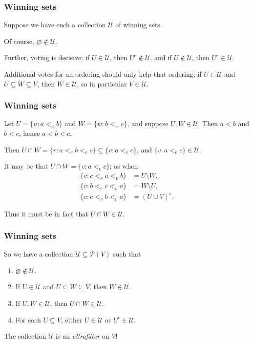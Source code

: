 \documentclass{beamer}
\theoremstyle{definition}
\begin{document}
\begin{frame}
    \frametitle{Winning sets}

    Suppose we have such a collection $\mathcal{U}$ of winning sets.

    \pause
    Of course, $\varnothing \notin \mathcal{U}$.

    \pause
    Further, voting is decisive: if $U \in \mathcal{U}$, then $U^c \notin \mathcal{U}$, and if $U \notin \mathcal{U}$, then $U^c \in \mathcal{U}$.

    \pause
    Additional votes for an ordering should only help that ordering; if $U \in \mathcal{U}$ and $U \subseteq W \subseteq V$, then $W \in \mathcal{U}$,
    so in particular $V \in \mathcal{U}$.

\end{frame}

\begin{frame}
    \frametitle{Winning sets}
    
    Let $U = \{u : a <_u b\}$ and $W = \{w : b <_w c\}$, and suppose $U, W \in \mathcal{U}$. Then $a < b$ and $b < c$, hence $a < b < c$.
    
    \pause
    Then $U \cap W = \{ v : a <_v b <_v c\} \subseteq \{v : a <_v c\}$, and $\{v : a <_v c\} \in \mathcal{U}$.

    \pause
    It may be that $U \cap W = \{v : a <_v c\}$; as when
    \begin{align*}
        \{v : c <_v a <_v b\} &= U \setminus W, \\
        \{v : b <_v c <_v a\} &= W \setminus U, \\
        \{v : c <_v b <_v a\} &= (U \cup V)^c.
    \end{align*}

    \pause
    Thus it must be in fact that $U \cap W \in \mathcal{U}$.

\end{frame}

\begin{frame}
    \frametitle{Winning sets}

    So we have a collection $\mathcal{U} \subseteq \mathcal{P}(V)$ such that
    \begin{enumerate}
        \item $\varnothing \notin \mathcal{U}$.
        \item If $U \in \mathcal{U}$ and $U \subseteq W \subseteq V$, then $W \in \mathcal{U}$.
        \item If $U, W \in \mathcal{U}$, then $U \cap W \in \mathcal{U}$.
        \item For each $U \subseteq V$, either $U \in \mathcal{U}$ or $U^c \in \mathcal{U}$.
    \end{enumerate}

    \pause
    The collection $\mathcal{U}$ is an \emph{ultrafilter} on $V$!

\end{frame}
\end{document}
